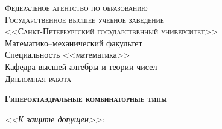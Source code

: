 
\thispagestyle{empty}

\begin{center}

        \textsc{Федеральное агентство по образованию}\\[0.2cm]

        \textsc{Государственное высшее учебное заведение \\
        <<Санкт-Петербургский государственный университет>>}\\[0.7cm]

        Математико--механический факультет \\[0.5cm]

        Специальность <<математика>>\\[0.7cm]

        Кафедра высшей алгебры и теории чисел\\[0.7cm]

        \textsc{Дипломная работа}\\[0.7cm]

        \begin{large}
                \textsc{\textbf{Гипероктаэдральные комбинаторные типы}}
        \end{large}

\end{center}

\vspace{0.7cm}

\textit{<<К защите допущен>>:}

